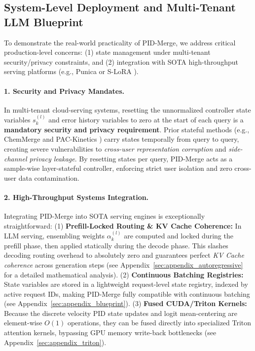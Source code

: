 \subsection{System-Level Deployment and Multi-Tenant LLM Blueprint}
\label{subsec:blueprint}

To demonstrate the real-world practicality of PID-Merge, we address critical production-level concerns: (1) state management under multi-tenant security/privacy constraints, and (2) integration with SOTA high-throughput serving platforms (e.g., Punica \cite{chen2023punica} or S-LoRA \cite{s-lora}).

\paragraph{1. Security and Privacy Mandates.}
In multi-tenant cloud-serving systems, resetting the unnormalized controller state variables $s_k^{(l)}$ and error history variables to zero at the start of each query is a \textbf{mandatory security and privacy requirement}. Prior stateful methods (e.g., ChemMerge \cite{chemmerge} and PAC-Kinetics \cite{pac_kinetics}) carry states temporally from query to query, creating severe vulnerabilities to \emph{cross-user representation corruption} and \emph{side-channel privacy leakage}. By resetting states per query, PID-Merge acts as a sample-wise layer-stateful controller, enforcing strict user isolation and zero cross-user data contamination.

\paragraph{2. High-Throughput Systems Integration.}
Integrating PID-Merge into SOTA serving engines is exceptionally straightforward:
(1) \textbf{Prefill-Locked Routing \& KV Cache Coherence:} In LLM serving, ensembling weights $\alpha_k^{(l)}$ are computed and locked during the prefill phase, then applied statically during the decode phase. This slashes decoding routing overhead to absolutely zero and guarantees perfect \emph{KV Cache coherence} across generation steps (see Appendix~\ref{sec:appendix_autoregressive} for a detailed mathematical analysis).
(2) \textbf{Continuous Batching Registries:} State variables are stored in a lightweight request-level state registry, indexed by active request IDs, making PID-Merge fully compatible with continuous batching (see Appendix~\ref{sec:appendix_blueprint}).
(3) \textbf{Fused CUDA/Triton Kernels:} Because the discrete velocity PID state updates and logit mean-centering are element-wise $O(1)$ operations, they can be fused directly into specialized Triton attention kernels, bypassing GPU memory write-back bottlenecks (see Appendix~\ref{sec:appendix_triton}).
